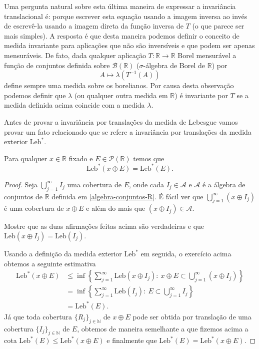 Uma pergunta natural sobre esta última maneira de expressar
a invariância translacional é: porque escrever
esta equação usando a imagem inversa ao invés de 
escrevê-la usando a imagem direta 
da função inversa de $T$ (o que parece ser mais simples). 
A resposta é que desta
maneira podemos definir o conceito de 
medida invariante para aplicações que não são 
inversíveis e que podem ser apenas mensuráveis.
De fato, dada qualquer aplicação $T:\mathbb{R}\to\mathbb{R}$
Borel mensurável a função de conjuntos definida 
sobre $\mathscr{B}(\mathbb{R})$ 
($\sigma$-álgebra de Borel de $\mathbb{R}$) por
\[
A\mapsto \lambda(T^{-1}(A))
\]
define sempre uma medida sobre os borelianos. 
Por causa desta observação podemos
definir que $\lambda$ (ou qualquer outra medida em $\mathbb{R}$)
é invariante por $T$ se a medida definida acima coincide 
com a medida $\lambda$. 


Antes de provar a invariância por translações  
da medida de Lebesgue vamos provar um fato 
relacionado que se refere  
a invariância por translações da medida exterior 
$\mathrm{Leb}^*$. 

\begin{teorema}
Para qualquer $x\in\mathbb{R}$ fixado e 
$E\in \mathcal{P}(\mathbb{R})$ temos que 
\[
\mathrm{Leb}^*(x\oplus E) 
=
\mathrm{Leb}^*(E).
\]
\end{teorema}

\begin{proof}
Seja $\bigcup_{j=1}^\infty I_j$ uma cobertura de $E$, 
onde cada $I_j\in\mathcal{A}$ e $\mathcal{A}$ é a álgebra 
de conjuntos de $\mathbb{R}$ 
definida em \eqref{algebra-conjuntos-R}. 
É fácil ver que  $\bigcup_{j=1}^\infty (x\oplus I_j)$
é uma cobertura de $x\oplus E$ e além do mais que 
$(x\oplus I_j) \in \mathcal{A}$. 
\begin{exercicio}
Mostre que as duas afirmações feitas acima são verdadeiras
e que 
$
\mathrm{Leb}(x\oplus I_j)
=
\mathrm{Leb}(I_j).
$
\end{exercicio}
Usando a definição da medida exterior
$\mathrm{Leb}^*$ em seguida, o exercício acima 
obtemos a seguinte estimativa 
\begin{align*}
\mathrm{Leb}^{*}(x\oplus E)
&\leq
\inf 
	\left\{
		\sum_{j=1}^\infty \mathrm{Leb}(x\oplus I_j):
		\ x\oplus E\subset \bigcup_{j=1}^\infty (x\oplus I_j)
	\right\}
\\
&=
\inf 
	\left\{
		\sum_{j=1}^\infty \mathrm{Leb}(I_j):
		\ E\subset \bigcup_{j=1}^\infty I_j
	\right\}
\\
&=
\mathrm{Leb}^{*}(E).
\end{align*}
Já que toda cobertura $\{R_j\}_{j\in\mathbb{N}}$ de $x\oplus E$
pode ser obtida por translação de uma cobertura 
$\{I_j\}_{j\in\mathbb{N}}$ de $E$, obtemos de maneira 
semelhante a que fizemos acima a cota 
$\mathrm{Leb}^{*}(E)\leq \mathrm{Leb}^{*}(x\oplus E)$ e
finalmente que  
$\mathrm{Leb}^{*}(E)=\mathrm{Leb}^{*}(x\oplus E)$.
\end{proof}










